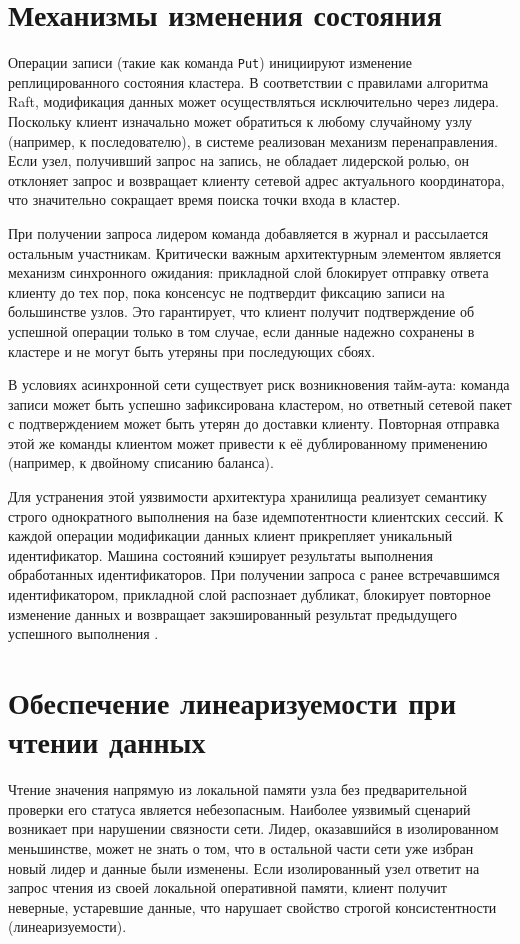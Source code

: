 \section{Механизмы изменения состояния}

Операции записи (такие как команда \texttt{Put}) инициируют изменение реплицированного состояния кластера. В соответствии с правилами алгоритма Raft, модификация данных может осуществляться исключительно через лидера. Поскольку клиент изначально может обратиться к любому случайному узлу (например, к последователю), в системе реализован механизм перенаправления. Если узел, получивший запрос на запись, не обладает лидерской ролью, он отклоняет запрос и возвращает клиенту сетевой адрес актуального координатора, что значительно сокращает время поиска точки входа в кластер.

При получении запроса лидером команда добавляется в журнал и рассылается остальным участникам. Критически важным архитектурным элементом является механизм синхронного ожидания: прикладной слой блокирует отправку ответа клиенту до тех пор, пока консенсус не подтвердит фиксацию записи на большинстве узлов. Это гарантирует, что клиент получит подтверждение об успешной операции только в том случае, если данные надежно сохранены в кластере и не могут быть утеряны при последующих сбоях.

В условиях асинхронной сети существует риск возникновения тайм-аута: команда записи может быть успешно зафиксирована кластером, но ответный сетевой пакет с подтверждением может быть утерян до доставки клиенту. Повторная отправка этой же команды клиентом может привести к её дублированному применению (например, к двойному списанию баланса).

Для устранения этой уязвимости архитектура хранилища реализует семантику строго однократного выполнения на базе идемпотентности клиентских сессий. К каждой операции модификации данных клиент прикрепляет уникальный идентификатор. Машина состояний кэширует результаты выполнения обработанных идентификаторов. При получении запроса с ранее встречавшимся идентификатором, прикладной слой распознает дубликат, блокирует повторное изменение данных и возвращает закэшированный результат предыдущего успешного выполнения \cite{kleppmann}.

\section{Обеспечение линеаризуемости при чтении данных}

Чтение значения напрямую из локальной памяти узла без предварительной проверки его статуса является небезопасным. Наиболее уязвимый сценарий возникает при нарушении связности сети. Лидер, оказавшийся в изолированном меньшинстве, может не знать о том, что в остальной части сети уже избран новый лидер и данные были изменены. Если изолированный узел ответит на запрос чтения из своей локальной оперативной памяти, клиент получит неверные, устаревшие данные, что нарушает свойство строгой консистентности (линеаризуемости).


